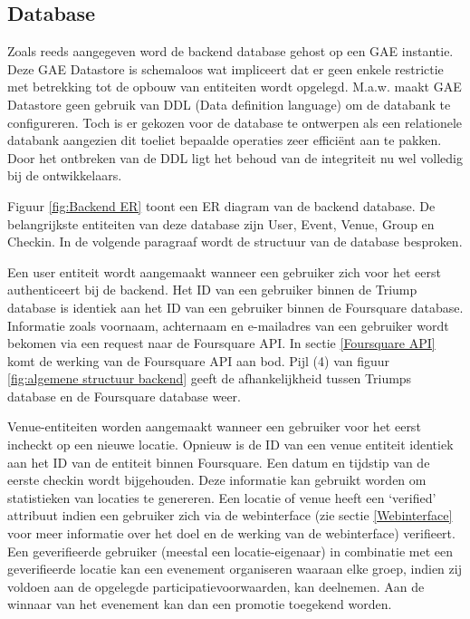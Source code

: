 \subsection{Database}
Zoals reeds aangegeven word de backend database gehost op een GAE instantie. Deze GAE Datastore is schemaloos wat impliceert dat er geen enkele restrictie met betrekking tot de opbouw van entiteiten wordt opgelegd. M.a.w. maakt GAE Datastore geen gebruik van DDL (Data definition language) om de databank te configureren. Toch is er gekozen voor de database te ontwerpen als een relationele databank aangezien dit toeliet bepaalde operaties zeer efficiënt aan te pakken. Door het ontbreken van de DDL ligt het behoud van de integriteit nu wel volledig bij de ontwikkelaars. 

Figuur \ref{fig:Backend ER} toont een ER diagram van de backend database.  De belangrijkste entiteiten van deze database zijn User, Event, Venue, Group en Checkin. In de volgende paragraaf wordt de structuur van de database besproken. 

Een user entiteit wordt aangemaakt wanneer een gebruiker zich voor het eerst authenticeert bij de backend. Het ID van een gebruiker binnen de Triump database is identiek aan het ID van een gebruiker binnen de Foursquare database. Informatie zoals voornaam, achternaam en e-mailadres van een gebruiker wordt bekomen via een request naar de Foursquare API. In sectie \ref{Foursquare API} komt de werking van de Foursquare API aan bod. Pijl (4) van figuur \ref{fig:algemene structuur backend} geeft de afhankelijkheid tussen Triumps database en de Foursquare database weer.

Venue-entiteiten worden aangemaakt wanneer een gebruiker voor het eerst incheckt op een nieuwe locatie. Opnieuw is de ID van een venue entiteit identiek aan het ID van de entiteit binnen Foursquare. Een datum en tijdstip van de eerste checkin wordt bijgehouden. Deze informatie kan gebruikt worden om statistieken van locaties te genereren. Een locatie of venue heeft een `verified' attribuut indien een gebruiker zich via de webinterface (zie sectie \ref{Webinterface} voor meer informatie over het doel en de werking van de webinterface) verifieert. Een geverifieerde gebruiker (meestal een locatie-eigenaar) in combinatie met een geverifieerde locatie kan een evenement organiseren waaraan elke groep, indien zij voldoen aan de opgelegde participatievoorwaarden, kan deelnemen. Aan de winnaar van het evenement kan dan een promotie toegekend worden.

